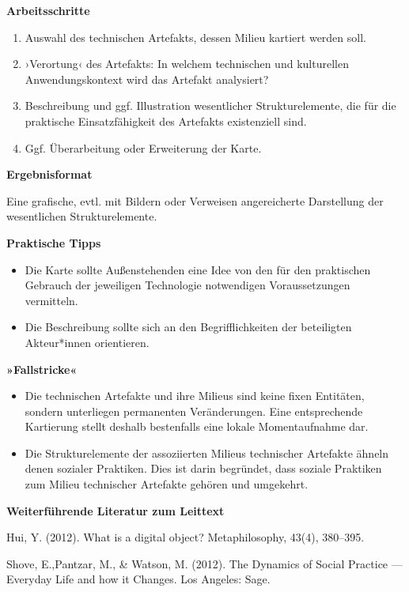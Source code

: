 \documentclass[
  a4paper,
]{book}
\providecommand{\tightlist}{%
  \setlength{\itemsep}{0pt}\setlength{\parskip}{0pt}}
\begin{document}
\textbf{Arbeitsschritte}

\begin{enumerate}
\def\labelenumi{\arabic{enumi}.}
\tightlist
\item
  Auswahl des technischen Artefakts, dessen Milieu kartiert werden soll.
\item
  ›Verortung‹ des Artefakts: In welchem technischen und kulturellen Anwendungskontext wird das Artefakt analysiert?
\item
  Beschreibung und ggf. Illustration wesentlicher Strukturelemente, die für die praktische Einsatzfähigkeit des Artefakts existenziell sind.
\item
  Ggf. Überarbeitung oder Erweiterung der Karte.
\end{enumerate}

\textbf{Ergebnisformat}

Eine grafische, evtl. mit Bildern oder Verweisen angereicherte Darstellung der wesentlichen Strukturelemente.

\textbf{Praktische Tipps}

\begin{itemize}
\tightlist
\item
  Die Karte sollte Außenstehenden eine Idee von den für den praktischen Gebrauch der jeweiligen Technologie notwendigen Voraussetzungen vermitteln.
\item
  Die Beschreibung sollte sich an den Begrifflichkeiten der beteiligten Akteur*innen orientieren.
\end{itemize}

\textbf{»Fallstricke«}

\begin{itemize}
\tightlist
\item
  Die technischen Artefakte und ihre Milieus sind keine fixen Entitäten, sondern unterliegen permanenten Veränderungen. Eine entsprechende Kartierung stellt deshalb bestenfalls eine lokale Momentaufnahme dar.
\item
  Die Strukturelemente der assoziierten Milieus technischer Artefakte ähneln denen sozialer Praktiken. Dies ist darin begründet, dass soziale Praktiken zum Milieu technischer Artefakte gehören und umgekehrt.
\end{itemize}

\textbf{Weiterführende Literatur zum Leittext}

Hui, Y. (2012). What is a digital object? Metaphilosophy, 43(4), 380--395.

Shove, E.,Pantzar, M., \& Watson, M. (2012). The Dynamics of Social Practice --- Everyday Life and how it Changes. Los Angeles: Sage.
\end{document}
